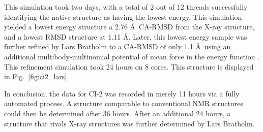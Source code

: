 This simulation took two days, with a total of 2 out of 12 threads successfully identifying the native structure as having the lowest energy.
This simulation yielded a lowest energy structure a 2.76 \AA~CA-RMSD from the X-ray structure, and a lowest RMSD structure at 1.11 \AA. Later, this lowest energy sample was further refined by Lars Bratholm to a CA-RMSD of only 1.1 \AA~using an additional multibody-multinomial potential of mean force in the energy function \cite{mumu}. This refinement simulation took 24 hours on 8 cores.
This structure is displayed in Fig.~\ref{fig:ci2_lars}.

In conclusion, the data for CI-2 was recorded in merely 11 hours via a fully automated process. A structure comparable to conventional NMR structures could then be determined after 36 hours. After an additional 24 hours, a structure that rivals X-ray structures was further determined by Lars Bratholm.

